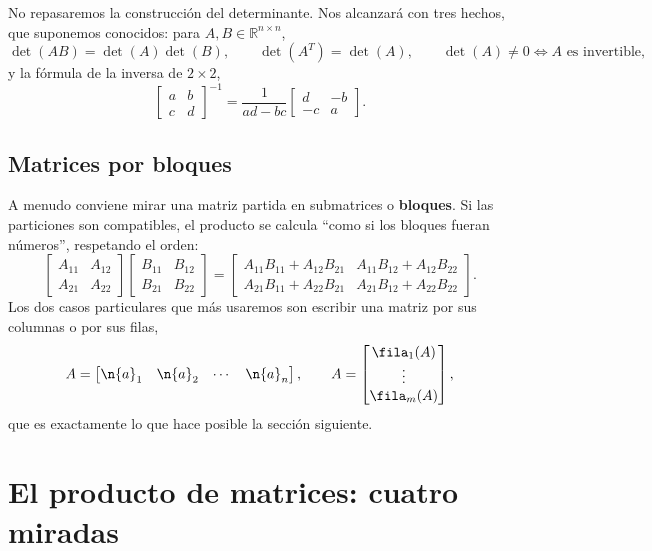 No repasaremos la construcción del determinante. Nos alcanzará con tres hechos,
que suponemos conocidos: para $A,B\in\mathbb{R}^{n\times n}$,
\[
\det(AB) = \det(A)\det(B),
\qquad
\det(A^T) = \det(A),
\qquad
\det(A)\neq 0 \iff A \text{ es invertible},
\]
y la fórmula de la inversa de $2\times2$,
\[
\begin{bmatrix} a & b\\ c& d\end{bmatrix}^{-1}
= \frac{1}{ad-bc}\begin{bmatrix} d & -b\\ -c& a\end{bmatrix}.
\]

\subsection{Matrices por bloques}
\label{sec:bloques}

A menudo conviene mirar una matriz partida en submatrices o \textbf{bloques}.
Si las particiones son compatibles, el producto se calcula ``como si los bloques
fueran números'', respetando el orden:
\[
\begin{bmatrix} A_{11} & A_{12}\\ A_{21} & A_{22}\end{bmatrix}
\begin{bmatrix} B_{11} & B_{12}\\ B_{21} & B_{22}\end{bmatrix}
=
\begin{bmatrix}
A_{11}B_{11}+A_{12}B_{21} & A_{11}B_{12}+A_{12}B_{22}\\[2pt]
A_{21}B_{11}+A_{22}B_{21} & A_{21}B_{12}+A_{22}B_{22}
\end{bmatrix}.
\]
Los dos casos particulares que más usaremos son escribir una matriz por sus
columnas o por sus filas,
\[
A = \begin{bmatrix} \n{a}_1 & \n{a}_2 & \cdots & \n{a}_n \end{bmatrix},
\qquad
A = \begin{bmatrix} \fila_1(A) \\ \vdots \\ \fila_m(A)\end{bmatrix},
\]
que es exactamente lo que hace posible la sección siguiente.

\section{El producto de matrices: cuatro miradas}
\label{sec:producto}

